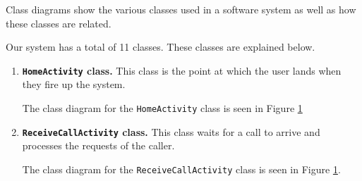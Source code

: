 \documentclass[12pt,svgnames,smaller]{article} %
\begin{document}
	Class diagrams show the various classes used in a software system as well as how these classes are related.
	
	Our system has a total of 11 classes. These classes are explained below.
	
	\begin{enumerate}
		\begin{figure}
			\caption{Class Diagrams for \texttt{HomeActivity}, \texttt{ReceiveCallActivity}, \texttt{IncomingCallActivity}, \texttt{CallInSessionActivity} and \texttt{MakeCallActivity}}			\label{fig:SystemAnalysisandDesign-Class_Diagram_-_HomeActivity,_ReceiveCallActivity,_IncomingCallActivity,_CallInSessionActivity,_MakeCallActivity}
		\end{figure}
		
		\item \textbf{\texttt{HomeActivity} class.} This class is the point at which the user lands when they fire up the system. 
		
		The class diagram for the \texttt{HomeActivity} class is seen in Figure \ref{fig:SystemAnalysisandDesign-Class_Diagram_-_HomeActivity,_ReceiveCallActivity,_IncomingCallActivity,_CallInSessionActivity,_MakeCallActivity}
		
		\item \textbf{\texttt{ReceiveCallActivity} class.} This class waits for a call to arrive and processes the requests of the caller.
		
		The class diagram for the \texttt{ReceiveCallActivity} class is seen in Figure \ref{fig:SystemAnalysisandDesign-Class_Diagram_-_HomeActivity,_ReceiveCallActivity,_IncomingCallActivity,_CallInSessionActivity,_MakeCallActivity}.
		

\end{enumerate}
\end{document}
